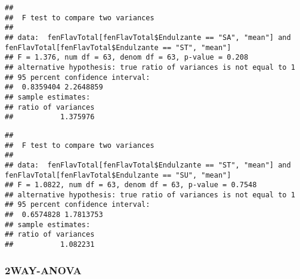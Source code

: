 \documentclass[
]{article}
\newenvironment{Shaded}{\begin{snugshade}}{\end{snugshade}}
\newcommand{\AttributeTok}[1]{\textcolor[rgb]{0.77,0.63,0.00}{#1}}
\newcommand{\FunctionTok}[1]{\textcolor[rgb]{0.00,0.00,0.00}{#1}}
\newcommand{\NormalTok}[1]{#1}
\newcommand{\SpecialCharTok}[1]{\textcolor[rgb]{0.00,0.00,0.00}{#1}}
\newcommand{\StringTok}[1]{\textcolor[rgb]{0.31,0.60,0.02}{#1}}
\begin{document}
\begin{Shaded}
\end{Shaded}

\begin{verbatim}
## 
##  F test to compare two variances
## 
## data:  fenFlavTotal[fenFlavTotal$Endulzante == "SA", "mean"] and fenFlavTotal[fenFlavTotal$Endulzante == "ST", "mean"]
## F = 1.376, num df = 63, denom df = 63, p-value = 0.208
## alternative hypothesis: true ratio of variances is not equal to 1
## 95 percent confidence interval:
##  0.8359404 2.2648859
## sample estimates:
## ratio of variances 
##           1.375976
\end{verbatim}

\begin{Shaded}
\end{Shaded}

\begin{verbatim}
## 
##  F test to compare two variances
## 
## data:  fenFlavTotal[fenFlavTotal$Endulzante == "ST", "mean"] and fenFlavTotal[fenFlavTotal$Endulzante == "SU", "mean"]
## F = 1.0822, num df = 63, denom df = 63, p-value = 0.7548
## alternative hypothesis: true ratio of variances is not equal to 1
## 95 percent confidence interval:
##  0.6574828 1.7813753
## sample estimates:
## ratio of variances 
##           1.082231
\end{verbatim}

\hypertarget{way-anova}{%
\subsubsection{2WAY-ANOVA}\label{way-anova}}
\end{document}
